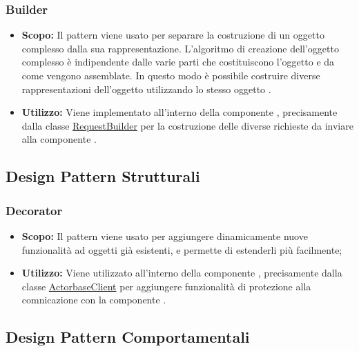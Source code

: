 \documentclass{scalatekids-article}
\begin{document}
\subsubsection{Builder}

\begin{itemize}
\item \textbf{Scopo:} Il pattern  viene usato per separare la
  costruzione di un oggetto complesso dalla sua rappresentazione. L'algoritmo di
  creazione dell'oggetto complesso è indipendente dalle varie parti che
  costituiscono l'oggetto e da come vengono assemblate. In questo modo è possibile
  costruire diverse rappresentazioni dell'oggetto utilizzando lo stesso oggetto
  .

\item \textbf{Utilizzo:} Viene implementato all'interno della componente
  , precisamente dalla classe
  \hyperref[sec:actorbase::driver::client::api::RequestBuilder]{RequestBuilder} per
  la costruzione delle diverse richieste  da inviare alla componente .
\end{itemize}

\subsection{Design Pattern Strutturali}

\subsubsection{Decorator}

\begin{itemize}
\item \textbf{Scopo:} Il pattern  viene usato per aggiungere dinamicamente
  nuove funzionalità ad oggetti già esistenti, e permette di estenderli più facilmente;

\item \textbf{Utilizzo:} Viene utilizzato all'interno della componente
  , precisamente dalla classe
  \hyperref[sec:actorbase::driver::client::ActorbaseClient]{ActorbaseClient} per
  aggiungere funzionalità di protezione  alla comnicazione
   con la componente .
\end{itemize}

\subsection{Design Pattern Comportamentali}
\end{document}
